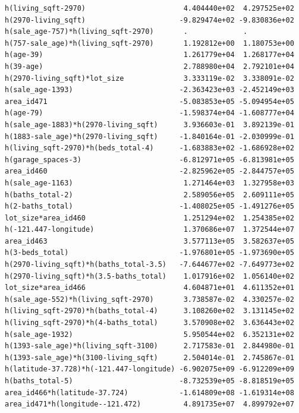 \documentclass[
]{article}
\begin{document}
\begin{verbatim}
h(living_sqft-2970)                       4.404440e+02  4.297525e+02
h(2970-living_sqft)                      -9.829474e+02 -9.830836e+02
h(sale_age-757)*h(living_sqft-2970)       .             .           
h(757-sale_age)*h(living_sqft-2970)       1.192812e+00  1.180753e+00
h(age-39)                                 1.261779e+04  1.268177e+04
h(39-age)                                 2.788980e+04  2.792101e+04
h(2970-living_sqft)*lot_size              3.333119e-02  3.338091e-02
h(sale_age-1393)                         -2.363423e+03 -2.452149e+03
area_id471                               -5.083853e+05 -5.094954e+05
h(age-79)                                -1.598374e+04 -1.608777e+04
h(sale_age-1883)*h(2970-living_sqft)      3.936603e-01  3.892139e-01
h(1883-sale_age)*h(2970-living_sqft)     -1.840164e-01 -2.030999e-01
h(living_sqft-2970)*h(beds_total-4)      -1.683883e+02 -1.686928e+02
h(garage_spaces-3)                       -6.812971e+05 -6.813981e+05
area_id460                               -2.825962e+05 -2.844757e+05
h(sale_age-1163)                          1.271464e+03  1.327958e+03
h(baths_total-2)                          2.589056e+05  2.609111e+05
h(2-baths_total)                         -1.408025e+05 -1.491276e+05
lot_size*area_id460                       1.251294e+02  1.254385e+02
h(-121.447-longitude)                     1.370686e+07  1.372544e+07
area_id463                                3.577113e+05  3.582637e+05
h(3-beds_total)                          -1.976801e+05 -1.973690e+05
h(2970-living_sqft)*h(baths_total-3.5)   -7.644677e+02 -7.649773e+02
h(2970-living_sqft)*h(3.5-baths_total)    1.017916e+02  1.056140e+02
lot_size*area_id466                       4.604871e+01  4.611352e+01
h(sale_age-552)*h(living_sqft-2970)       3.738587e-02  4.330257e-02
h(living_sqft-2970)*h(baths_total-4)      3.108260e+02  3.131145e+02
h(living_sqft-2970)*h(4-baths_total)      3.570908e+02  3.636443e+02
h(sale_age-1932)                          5.950544e+02  6.352131e+02
h(1393-sale_age)*h(living_sqft-3100)      2.717583e-01  2.844980e-01
h(1393-sale_age)*h(3100-living_sqft)      2.504014e-01  2.745867e-01
h(latitude-37.728)*h(-121.447-longitude) -6.902075e+09 -6.912209e+09
h(baths_total-5)                         -8.732539e+05 -8.818519e+05
area_id466*h(latitude-37.724)            -1.614809e+08 -1.619314e+08
area_id471*h(longitude--121.472)          4.891735e+07  4.899792e+07
                                                                    

\end{verbatim}
\end{document}

